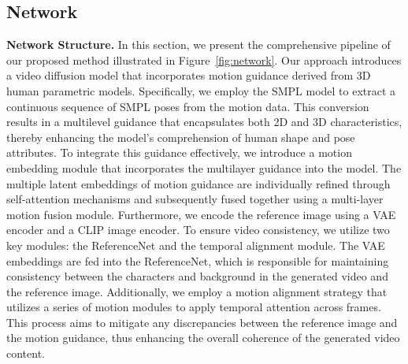 \subsection{Network}
\label{subsec:network}



\textbf{Network Structure.}
In this section, we present the comprehensive pipeline of our proposed method illustrated in Figure~\ref{fig:network}. 
Our approach introduces a video diffusion model that incorporates motion guidance derived from 3D human parametric models.
Specifically, we employ the SMPL model to extract a continuous sequence of SMPL poses from the motion data. 
This conversion results in a multilevel guidance that encapsulates both 2D and 3D characteristics, thereby enhancing the model's comprehension of human shape and pose attributes. 
To integrate this guidance effectively, we introduce a motion embedding module that incorporates the multilayer guidance into the model.
The multiple latent embeddings of motion guidance are individually refined through self-attention mechanisms and subsequently fused together using a multi-layer motion fusion module.
Furthermore, we encode the reference image using a VAE encoder and a CLIP image encoder. 
To ensure video consistency, we utilize two key modules: the ReferenceNet and the temporal alignment module. 
The VAE embeddings are fed into the ReferenceNet, which is responsible for maintaining consistency between the characters and background in the generated video and the reference image.
Additionally, we employ a motion alignment strategy that utilizes a series of motion modules to apply temporal attention across frames. 
This process aims to mitigate any discrepancies between the reference image and the motion guidance, thus enhancing the overall coherence of the generated video content.

